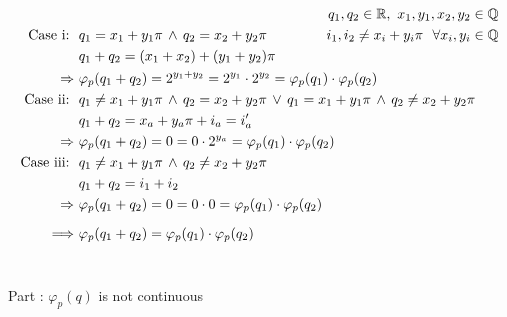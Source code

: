 \documentclass[12pt, a4paper]{article}
\newcommand{\rom}[1]{\uppercase\expandafter{\romannumeral #1\relax}}
\begin{document}
\begin{align*}
& & \mathllap{q_1,q_2\in \mathbb{R},~ x_1,y_1,x_2,y_2\in\mathbb{Q}}\\
\text{Case \rom{1}:~~} & q_1 = x_1 + y_1\pi \,\wedge\, q_2 = x_2 + y_2\pi & ~~\mathllap{i_1,i_2 \neq x_i+y_i\pi ~~\forall x_i,y_i\in\mathbb{Q}}\\
& q_1 + q_2 = (x_1+x_2) + (y_1+y_2)\pi\\
\Rightarrow~ & \varphi_p(q_1 + q_2) = 2^{y_1+y_2} = 2^{y_1} \cdot 2^{y_2} =\varphi_p(q_1) \cdot \varphi_p(q_2)\\
\text{Case \rom{2}:~~} & q_1 \neq x_1 + y_1\pi \,\wedge\, q_2 = x_2 + y_2\pi \,\vee\, q_1 = x_1 + y_1\pi \,\wedge\, q_2 \neq x_2 + y_2\pi\\
& q_1 + q_2 = x_a + y_a\pi + i_a = i_a'\\
\Rightarrow~ & \varphi_p(q_1 + q_2) = 0 = 0 \cdot 2^{y_a} =\varphi_p(q_1) \cdot \varphi_p(q_2)\\
\text{Case \rom{3}:~~} & q_1 \neq x_1 + y_1\pi \,\wedge\, q_2 \neq x_2 + y_2\pi \\
& q_1 + q_2 = i_1 + i_2\\
\Rightarrow~ & \varphi_p(q_1 + q_2) = 0 = 0 \cdot 0 =\varphi_p(q_1) \cdot \varphi_p(q_2)\vspace*{20mm} \\
\Longrightarrow~ & \varphi_p(q_1 + q_2) = \varphi_p(q_1) \cdot \varphi_p(q_2) \phantom{a^{b^{c^{d^e}}}}\\
\end{align*}
\vspace*{0mm}\\
\begin{Large}Part \rom{2}: $\varphi_p(q)$ is not continuous\end{Large}
\end{document}
